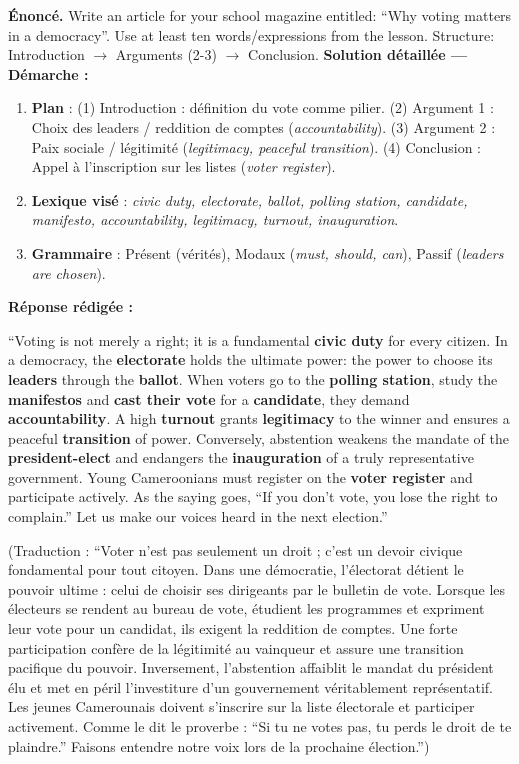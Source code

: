 \documentclass[11pt]{article}
\begin{document}
\begin{exoresolu}
\textbf{Énoncé.} Write an article for your school magazine entitled: “Why voting matters in a democracy”. Use at least ten words/expressions from the lesson. Structure: Introduction $\rightarrow$ Arguments (2-3) $\rightarrow$ Conclusion.
\tcblower
\textbf{Solution détaillée — Démarche :}
\begin{enumerate}
\item \textbf{Plan} : (1) Introduction : définition du vote comme pilier. (2) Argument 1 : Choix des leaders / reddition de comptes (\emph{accountability}). (3) Argument 2 : Paix sociale / légitimité (\emph{legitimacy, peaceful transition}). (4) Conclusion : Appel à l'inscription sur les listes (\emph{voter register}).
\item \textbf{Lexique visé} : \emph{civic duty, electorate, ballot, polling station, candidate, manifesto, accountability, legitimacy, turnout, inauguration}.
\item \textbf{Grammaire} : Présent (vérités), Modaux (\emph{must, should, can}), Passif (\emph{leaders are chosen}).
\end{enumerate}
\textbf{Réponse rédigée :}

“Voting is not merely a right; it is a fundamental \textbf{civic duty} for every citizen. In a democracy, the \textbf{electorate} holds the ultimate power: the power to choose its \textbf{leaders} through the \textbf{ballot}. When voters go to the \textbf{polling station}, study the \textbf{manifestos} and \textbf{cast their vote} for a \textbf{candidate}, they demand \textbf{accountability}. A high \textbf{turnout} grants \textbf{legitimacy} to the winner and ensures a peaceful \textbf{transition} of power. Conversely, abstention weakens the mandate of the \textbf{president-elect} and endangers the \textbf{inauguration} of a truly representative government. Young Cameroonians must register on the \textbf{voter register} and participate actively. As the saying goes, “If you don't vote, you lose the right to complain.” Let us make our voices heard in the next election.”

(Traduction : “Voter n'est pas seulement un droit ; c'est un devoir civique fondamental pour tout citoyen. Dans une démocratie, l'électorat détient le pouvoir ultime : celui de choisir ses dirigeants par le bulletin de vote. Lorsque les électeurs se rendent au bureau de vote, étudient les programmes et expriment leur vote pour un candidat, ils exigent la reddition de comptes. Une forte participation confère de la légitimité au vainqueur et assure une transition pacifique du pouvoir. Inversement, l'abstention affaiblit le mandat du président élu et met en péril l'investiture d'un gouvernement véritablement représentatif. Les jeunes Camerounais doivent s'inscrire sur la liste électorale et participer activement. Comme le dit le proverbe : “Si tu ne votes pas, tu perds le droit de te plaindre.” Faisons entendre notre voix lors de la prochaine élection.”)


\end{exoresolu}
\end{document}
